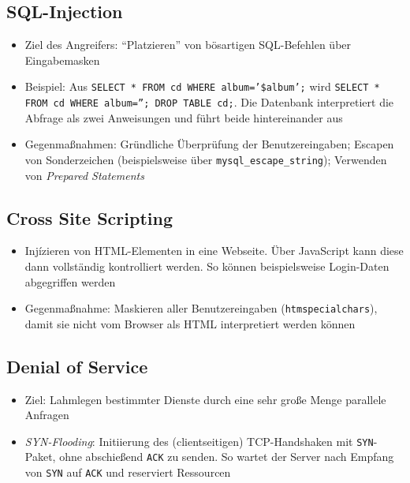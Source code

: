 \subsection{SQL-Injection}
\begin{itemize}
	\item Ziel des Angreifers: "`Platzieren"' von bösartigen SQL-Befehlen über Eingabemasken
	\item Beispiel: Aus \texttt{SELECT * FROM cd WHERE album='\$album';} wird \texttt{SELECT * FROM cd WHERE album=''; DROP TABLE cd;}. Die Datenbank interpretiert die Abfrage als zwei Anweisungen und führt beide hintereinander aus
	\item Gegenmaßnahmen: Gründliche Überprüfung der Benutzereingaben; Escapen von Sonderzeichen (beispielsweise über \texttt{mysql\_escape\_string}); Verwenden von \textit{Prepared Statements}
\end{itemize}


\subsection{Cross Site Scripting}
\begin{itemize}
	\item Injízieren von HTML-Elementen in eine Webseite. Über JavaScript kann diese dann vollständig kontrolliert werden. So können beispielsweise Login-Daten abgegriffen werden
	\item Gegenmaßnahme: Maskieren aller Benutzereingaben (\texttt{htmspecialchars}), damit sie nicht vom Browser als HTML interpretiert werden können
\end{itemize}


\subsection{Denial of Service}
\begin{itemize}
	\item Ziel: Lahmlegen bestimmter Dienste durch eine sehr große Menge parallele Anfragen
	\item \textit{SYN-Flooding}: Initiierung des (clientseitigen) TCP-Handshaken mit \texttt{SYN}-Paket, ohne abschießend \texttt{ACK} zu senden. So wartet der Server nach Empfang von \texttt{SYN} auf \texttt{ACK} und reserviert Ressourcen
\end{itemize}


